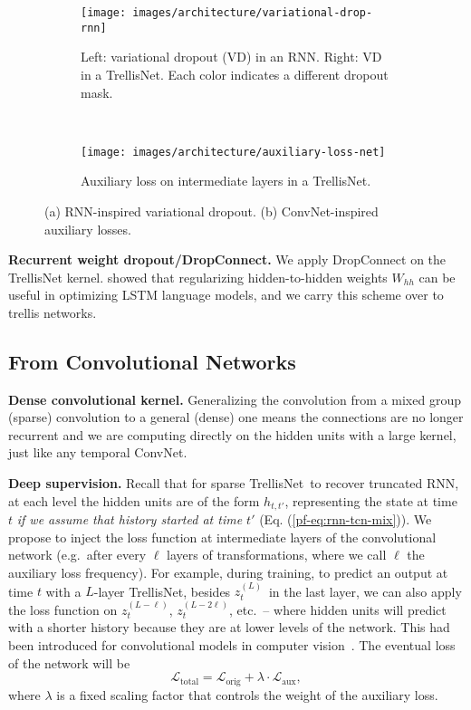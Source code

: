 \documentclass{article} \usepackage{iclr2019_conference,times}
\newcommand\mypara[1]{\vspace{0mm}\noindent\textbf{#1}}
\newcommand{\model}{TrellisNet}
\begin{document}
\begin{figure}
\centering
\vspace{-.3in}
    \begin{subfigure}[b]{.6\textwidth}
        \centering
        \texttt{[image: images/architecture/variational-drop-rnn]}
        \caption{Left: variational dropout (VD) in an RNN. Right: VD in a TrellisNet. Each color indicates a different dropout mask.}
        \label{fig:variational-dropout}
    \end{subfigure}
    ~
    \begin{subfigure}[b]{.38\textwidth}
        \centering
        \texttt{[image: images/architecture/auxiliary-loss-net]}
        \caption{Auxiliary loss on intermediate layers in a \model.}
        \label{fig:auxiliary-loss}
    \end{subfigure}
\caption{(a) RNN-inspired variational dropout. (b) ConvNet-inspired auxiliary losses.}
\label{fig:vd-auxiliary}
\vspace{-.15in}
\end{figure}

\mypara{Recurrent weight dropout/DropConnect.} We apply DropConnect on the TrellisNet kernel. \cite{merityRegOpt} showed that regularizing hidden-to-hidden weights $W_{hh}$ can be useful in optimizing LSTM language models, and we carry this scheme over to trellis networks.

\subsection{From Convolutional Networks}
\label{appendix:from-tcns}

\mypara{Dense convolutional kernel.} Generalizing the convolution from a mixed group (sparse) convolution to a general (dense) one means the connections are no longer recurrent and we are computing directly on the hidden units with a large kernel, just like any temporal ConvNet.

\mypara{Deep supervision.} Recall that for sparse \model~to recover truncated RNN, at each level the hidden units are of the form $h_{t,t'}$, representing the state at time $t$ \emph{if we assume that history started at time $t'$} (Eq. (\ref{pf-eq:rnn-tcn-mix})). We propose to inject the loss function at intermediate layers of the convolutional network (e.g.\ after every $\ell$ layers of transformations, where we call $\ell$ the auxiliary loss frequency). For example, during training, to predict an output at time $t$ with a $L$-layer \model, besides \small$z_t^{(L)}$\normalsize~in the last layer, we can also apply the loss function on \small$z_t^{(L-\ell)}$, $z_t^{(L-2\ell)}$\normalsize, etc.~-- where hidden units will predict with a shorter history because they are at lower levels of the network. This had been introduced for convolutional models in computer vision~\citep{lee2015deeply,xie2015holistically}. The eventual loss of the network will be
\begin{equation}
\mathcal{L}_\text{total} = \mathcal{L}_\text{orig} + \lambda \cdot \mathcal{L}_\text{aux},
\end{equation}
where $\lambda$ is a fixed scaling factor that controls the weight of the auxiliary loss.
\end{document}
